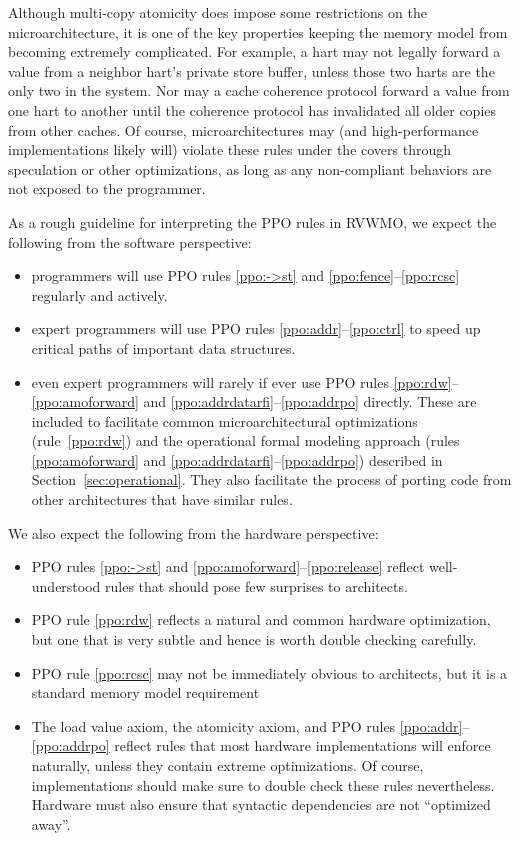 Although multi-copy atomicity does impose some restrictions on the microarchitecture, it is one of the key properties keeping the memory model from becoming extremely complicated.
For example, a hart may not legally forward a value from a neighbor hart's private store buffer, unless those two harts are the only two in the system.
Nor may a cache coherence protocol forward a value from one hart to another until the coherence protocol has invalidated all older copies from other caches.
Of course, microarchitectures may (and high-performance implementations likely will) violate these rules under the covers through speculation or other optimizations, as long as any non-compliant behaviors are not exposed to the programmer.

As a rough guideline for interpreting the PPO rules in RVWMO, we expect the following from the software perspective:
\begin{itemize}
  \item programmers will use PPO rules \ref{ppo:->st} and \ref{ppo:fence}--\ref{ppo:rcsc} regularly and actively.
  \item expert programmers will use PPO rules \ref{ppo:addr}--\ref{ppo:ctrl} to speed up critical paths of important data structures.
  \item even expert programmers will rarely if ever use PPO rules \ref{ppo:rdw}--\ref{ppo:amoforward} and \ref{ppo:addrdatarfi}--\ref{ppo:addrpo} directly.  These are included to facilitate common microarchitectural optimizations (rule~\ref{ppo:rdw}) and the operational formal modeling approach (rules \ref{ppo:amoforward} and \ref{ppo:addrdatarfi}--\ref{ppo:addrpo}) described in Section~\ref{sec:operational}.  They also facilitate the process of porting code from other architectures that have similar rules.
\end{itemize}

We also expect the following from the hardware perspective:
\begin{itemize}
  \item PPO rules \ref{ppo:->st} and \ref{ppo:amoforward}--\ref{ppo:release} reflect well-understood rules that should pose few surprises to architects.
  \item PPO rule \ref{ppo:rdw} reflects a natural and common hardware optimization, but one that is very subtle and hence is worth double checking carefully.
  \item PPO rule \ref{ppo:rcsc} may not be immediately obvious to architects, but it is a standard memory model requirement
  \item The load value axiom, the atomicity axiom, and PPO rules \ref{ppo:addr}--\ref{ppo:addrpo} reflect rules that most hardware implementations will enforce naturally, unless they contain extreme optimizations.  Of course, implementations should make sure to double check these rules nevertheless.  Hardware must also ensure that syntactic dependencies are not ``optimized away''.
\end{itemize}

